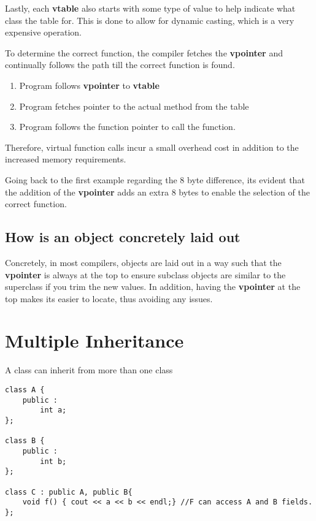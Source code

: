 \documentclass{article}
\newenvironment{ablock}[1]{%
    \tcolorbox[beamer,%
    noparskip,breakable,
    colback=lightcoral,colframe=darkred,%
    colbacklower=tomato!75!lightcoral,%
    title=#1]}%
    {\endtcolorbox}
\begin{document}
Lastly, each \textbf{vtable} also starts with some type of value to help indicate what class the table for. This is done to allow for dynamic casting, which is a very expensive operation.  

To determine the correct function, the compiler fetches the \textbf{vpointer} and continually follows the path till the correct function is found.



\begin{ablock}{Steps that occur when calling a virtual method}
\begin{enumerate}
\item Program follows \textbf{vpointer} to \textbf{vtable}
\item Program fetches pointer to the actual method from the table 
\item Program follows the function pointer to call the function.
\end{enumerate}

Therefore, virtual function calls incur a small overhead cost in addition to the increased memory requirements. 
\end{ablock}

Going back to the first example regarding the 8 byte difference, its evident that the addition of the \textbf{vpointer} adds an extra 8 bytes to enable the selection of the correct function. 


\subsection{How is an object concretely laid out }
Concretely, in most compilers, objects are laid out in a way such that the \textbf{vpointer} is always at the top to ensure subclass objects are similar to the superclass if you trim the new values. In addition, having the \textbf{vpointer} at the top makes its easier to locate, thus avoiding any issues. 
 
\section{Multiple Inheritance}
A class can inherit from more than one class 
\begin{lstlisting}
class A {
	public :
		int a;
};

class B {
	public : 
		int b;
};

class C : public A, public B{
	void f() { cout << a << b << endl;} //F can access A and B fields. 
};
\end{lstlisting}
\end{document}
